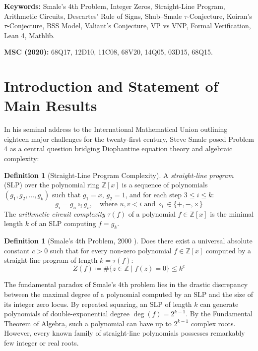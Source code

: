 \documentclass[11pt,a4paper]{article}
\theoremstyle{definition}
\newtheorem{definition}[theorem]{Definition}
\begin{document}
\vspace{0.5em}
\noindent\textbf{Keywords:} Smale's 4th Problem, Integer Zeros, Straight-Line Program, Arithmetic Circuits, Descartes' Rule of Signs, Shub--Smale $\tau$-Conjecture, Koiran's $\tau$-Conjecture, BSS Model, Valiant's Conjecture, VP vs VNP, Formal Verification, Lean 4, Mathlib.

\noindent\textbf{MSC (2020):} 68Q17, 12D10, 11C08, 68V20, 14Q05, 03D15, 68Q15.

\tableofcontents
\newpage

\section{Introduction and Statement of Main Results}

In his seminal address to the International Mathematical Union outlining eighteen major challenges for the twenty-first century, Steve Smale \cite{smale2000} posed Problem 4 as a central question bridging Diophantine equation theory and algebraic complexity:

\begin{definition}[Straight-Line Program Complexity]\label{def:slp_complexity}
A \emph{straight-line program} (SLP) over the polynomial ring $\mathbb{Z}[x]$ is a sequence of polynomials $(g_1, g_2, \dots, g_k)$ such that $g_1 = x$, $g_2 = 1$, and for each step $3 \le i \le k$:
\begin{equation}\label{eq:slp_step}
g_i = g_u \circ_i g_v, \quad \text{where } u, v < i \text{ and } \circ_i \in \{+, -, \times\}
\end{equation}
The \emph{arithmetic circuit complexity} $\tau(f)$ of a polynomial $f \in \mathbb{Z}[x]$ is the minimal length $k$ of an SLP computing $f = g_k$.
\end{definition}

\begin{definition}[Smale's 4th Problem, 2000 \cite{smale2000}]\label{def:smale_4}
Does there exist a universal absolute constant $c > 0$ such that for every non-zero polynomial $f \in \mathbb{Z}[x]$ computed by a straight-line program of length $k = \tau(f)$:
\begin{equation}\label{eq:smale_bound}
Z(f) \coloneqq \# \{ z \in \mathbb{Z} \mid f(z) = 0 \} \le k^c
\end{equation}
\end{definition}

The fundamental paradox of Smale's 4th problem lies in the drastic discrepancy between the maximal degree of a polynomial computed by an SLP and the size of its integer zero locus. By repeated squaring, an SLP of length $k$ can generate polynomials of double-exponential degree $\deg(f) = 2^{k-1}$. By the Fundamental Theorem of Algebra, such a polynomial can have up to $2^{k-1}$ complex roots. However, every known family of straight-line polynomials possesses remarkably few integer or real roots.
\end{document}
